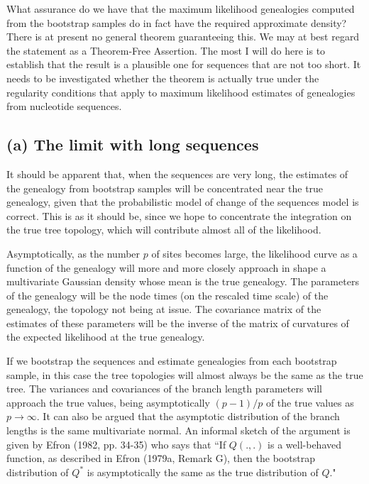 What assurance do we have that
the maximum likelihood genealogies computed from the bootstrap samples do
in fact have the required approximate density?  There is at present no
general theorem guaranteeing this.  We may at best regard the
statement as a Theorem-Free Assertion.  The most I will do here is to establish
that the result is a plausible one for sequences that are not too short.  It
needs to be investigated whether
the theorem is actually true under the regularity conditions that apply to
maximum likelihood estimates of genealogies from nucleotide sequences.

\subsection*{(a) The limit with long sequences}

It should be apparent that, when the sequences are very long, the
estimates of the genealogy from bootstrap samples will be concentrated near
the true genealogy, given that the probabilistic model of change of the
sequences
model is correct.  This is as it should be, since we hope to concentrate the
integration on the true tree topology, which will contribute almost all of the
likelihood.

Asymptotically, as the number $p$ of sites becomes large, the likelihood
curve as a function of the genealogy will more and more closely approach in
shape a multivariate Gaussian density whose mean is the true genealogy.
The parameters of the genealogy will be the node times (on the
rescaled time scale) of the genealogy, the topology not being at issue.
The covariance matrix of the estimates of these parameters will be
the inverse of the matrix of curvatures of the expected likelihood at the true
genealogy.

If we bootstrap the sequences and estimate genealogies from each bootstrap
sample, in this case the tree topologies will almost always be the same as
the true tree.  The variances and covariances of the branch length parameters
will approach the true values, being asymptotically $(p-1)/p$ of the true
values as $p \rightarrow \infty$.  It can also be argued that the asymptotic
distribution of the branch lengths is the same multivariate normal.  An
informal sketch of the argument is
given by Efron (1982, pp. 34-35) who says that ``If $Q(.,.)$ is a well-behaved
function, as described in Efron (1979a, Remark G), then the bootstrap
distribution of $Q^*$ is asymptotically the same as the true distribution of
$Q$."

